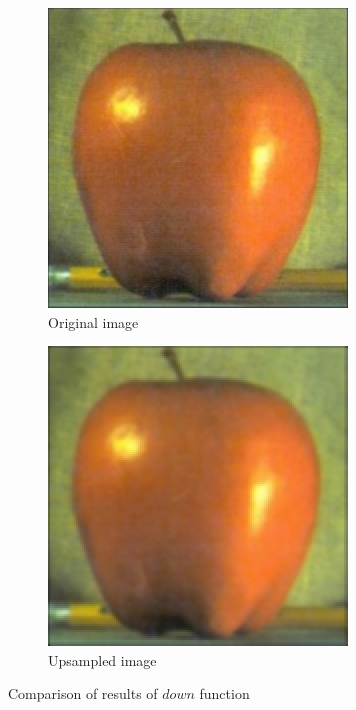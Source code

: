 \begin{figure}[!h]
\centering
\begin{subfigure}{0.5\textwidth}
  \centering
  \includegraphics[width=0.8\linewidth]{input/p1-1-3.png}
  \caption{Original image}
\end{subfigure}%
\begin{subfigure}{0.5\textwidth}
  \centering
  \includegraphics[width=0.8\linewidth]{output/upSample.jpg}
  \caption{Upsampled image}
\end{subfigure}%
 \caption{Comparison of results of $down$ function}
\label{fig:down-gauss-results}
\end{figure}

